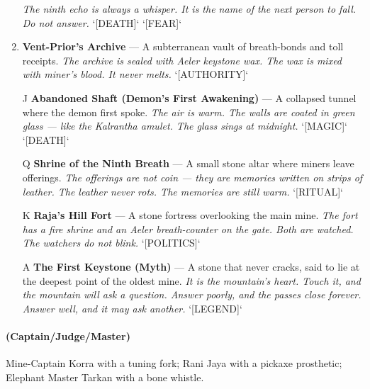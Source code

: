 \begin{enumerate}
  \hfill \textit{The ninth echo is always a whisper. It is the name of the next person to fall. Do not answer.} `[DEATH]` `[FEAR]`
\item \textbf{Vent-Prior's Archive} --- A subterranean vault of breath-bonds and toll receipts.
  \hfill \textit{The archive is sealed with Aeler keystone wax. The wax is mixed with miner's blood. It never melts.} `[AUTHORITY]`
\item[J] \textbf{Abandoned Shaft (Demon's First Awakening)} --- A collapsed tunnel where the demon first spoke.
  \hfill \textit{The air is warm. The walls are coated in green glass — like the Kalrantha amulet. The glass sings at midnight.} `[MAGIC]` `[DEATH]`
\item[Q] \textbf{Shrine of the Ninth Breath} --- A small stone altar where miners leave offerings.
  \hfill \textit{The offerings are not coin — they are memories written on strips of leather. The leather never rots. The memories are still warm.} `[RITUAL]`
\item[K] \textbf{Raja's Hill Fort} --- A stone fortress overlooking the main mine.
  \hfill \textit{The fort has a fire shrine and an Aeler breath-counter on the gate. Both are watched. The watchers do not blink.} `[POLITICS]`
\item[A] \textbf{The First Keystone (Myth)} --- A stone that never cracks, said to lie at the deepest point of the oldest mine.
  \hfill \textit{It is the mountain's heart. Touch it, and the mountain will ask a question. Answer poorly, and the passes close forever. Answer well, and it may ask another.} `[LEGEND]`
\end{enumerate}

\paragraph*{(Captain/Judge/Master)} Mine-Captain Korra with a tuning fork; Rani Jaya with a pickaxe prosthetic; Elephant Master Tarkan with a bone whistle.

